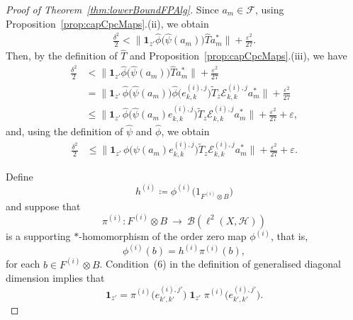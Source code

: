 \documentclass[10pt,a4paper]{amsart}
\newcommand{\Bcal}{\mathcal{B}}
\newcommand{\Ecal}{\mathcal{E}}
\newcommand{\Fcal}{\mathcal{F}}
\newcommand{\Hcal}{\mathcal{H}}
\newcommand{\bop}[1]{\Bcal({#1})}
\newcommand{\e}{\varepsilon}
\newcommand{\indF}{\mathbf{1}}
\newcommand{\myhyp}{\textnormal{-}\hskip0pt\relax}
\newcommand{\normBig}[1]{{\Big\lVert #1 \Big \rVert}}
\newcommand{\rAr}{\longrightarrow}
\newcommand{\unMatImg}[3]{{\Ecal_{#3}^{(#1), #2}}}
\begin{document}
\begin{proof}[Proof of Theorem~\ref{thm:lowerBoundFPAlg}]
        Since ${a_m \in \Fcal}$, using Proposition~\ref{prop:capCpcMaps}.(ii), we obtain
         \begin{align*}
          \frac{\delta^2}{2}
          < \normBig{\indF_{z'} \widehat{\phi} \big(\widehat{\psi}(a_m) \big)  \widehat{T} a_m^\ast } + \frac{\e^2}{27}.
        \end{align*}
        Then, by the definition of $\widehat{T}$ and Proposition~\ref{prop:capCpcMaps}.(iii), we have
        \begin{align*}
          \frac{\delta^2}{2}
           & < \normBig{\indF_{z'} \widehat{\phi} \big(\widehat{\psi}(a_m) \big)  \widehat{T} a_m^\ast } + \frac{\e^2}{27}\\
           & = \normBig{\indF_{z'}  \, \widehat{\phi} \big(\widehat{\psi}(a_m) \big) \widehat{\phi}\big(e_{k,k}^{(i),j} \big)  \widetilde{T}_{z} \unMatImg{i}{j}{k,k} a_m^\ast} + \frac{\e^2}{27}\\
           & \le \normBig{\indF_{z'} \, \widehat{\phi}\big(\widehat{\psi}(a_m) e_{k,k}^{(i),j} \big)   \widetilde{T}_{z} \unMatImg{i}{j}{k,k} a_m^\ast} + \frac{\e^2}{27} +\e,
        \end{align*}
        and, using the definition of
        $\widehat{\psi}$ and $\widehat{\phi}$,
        we obtain
        \begin{align*}
          \frac{\delta^2}{2}
           & \le   \normBig{\indF_{z'} \, {\phi}\big({\psi}(a_m) e_{k,k}^{(i),j} \big)   \widetilde{T}_{z} \unMatImg{i}{j}{k,k} a_m^\ast} + \frac{\e^2}{27} +\e.
        \end{align*}
  
        Define 
        \[{h^{(i)} \coloneq \phi^{(i)} \big( 1_{F^{(i)} \otimes B} \big)}\]
        and suppose that
         \[\pi^{(i)} \colon F^{(i)} \otimes B~\rAr~ \bop{\ell^2(X,\Hcal)}\]
         is a supporting ${\ast}$\myhyp{}homomorphism of the 
         order zero map $\phi^{(i)}$, that is,
        \[{\phi^{(i)}(b) = h^{(i)} \pi^{(i)}(b)},\]
        for each ${b \in F^{(i)} \otimes B}$.
    Condition~(6) in the definition of generalised diagonal dimension implies that
    \begin{equation*}
        \indF_{z' }= \pi^{(i)}\big(e^{{(i)},{j'}}_{k',k'} \big) \; \indF_{z' } \;\pi^{(i)}\big(e^{{(i)},{j'}}_{k',k'} \big) .
    \end{equation*}


\end{proof}
\end{document}
